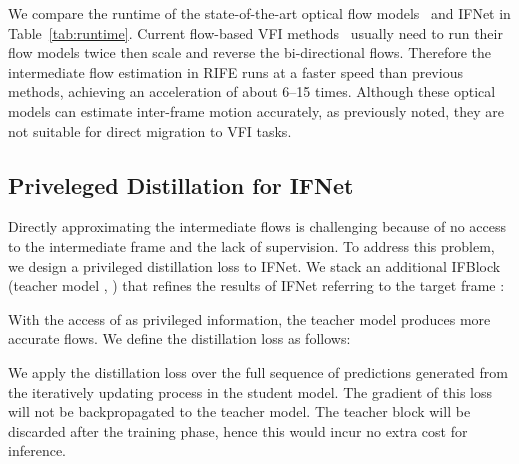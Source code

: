 \documentclass[final]{cvpr}
\begin{document}
We compare the runtime of the state-of-the-art optical flow models~\cite{sun2018pwc, teed2020raft} and IFNet in Table~\ref{tab:runtime}. Current flow-based VFI methods~\cite{jiang2018super, bao2019depth, niklaus2020softmax} usually need to run their flow models twice then scale and reverse the bi-directional flows. Therefore the intermediate flow estimation in RIFE runs at a faster speed than previous methods, achieving an acceleration of about 6--15 times. Although these optical models can estimate inter-frame motion accurately, as previously noted, they are not suitable for direct migration to VFI tasks.




















\subsection{Priveleged Distillation for IFNet}

\label{subsec:leakage}

Directly approximating the intermediate flows is challenging because of no access to the intermediate frame and the lack of supervision. To address this problem, we design a privileged distillation loss to IFNet. We stack an additional IFBlock (teacher model , ) that refines the results of IFNet referring to the target frame : 



With the access of  as privileged information, the teacher model produces more accurate flows. We define the distillation loss  as follows:
 
We apply the distillation loss over the full sequence of predictions generated from the iteratively updating process in the student model. The gradient of this loss will not be backpropagated to the teacher model. The teacher block will be discarded after the training phase, hence this would incur no extra cost for inference.
\end{document}
